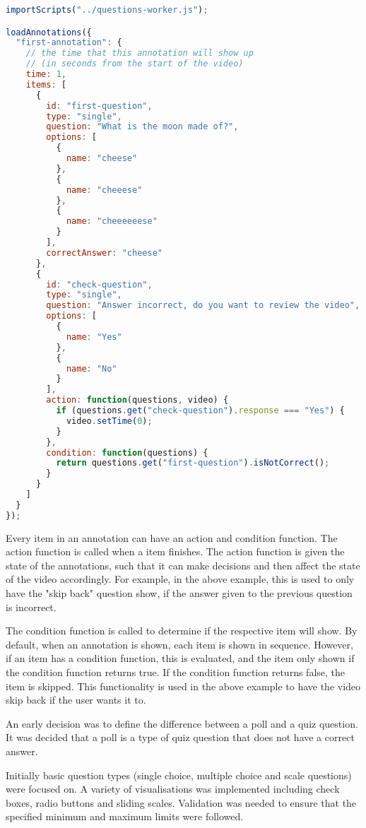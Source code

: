 \begin{lstlisting}[language=javascript,caption={\label{code:questionworker} Code for loading an annotation}]
importScripts("../questions-worker.js");

loadAnnotations({
  "first-annotation": {
    // the time that this annotation will show up
    // (in seconds from the start of the video)
    time: 1,
    items: [
      {
        id: "first-question",
        type: "single",
        question: "What is the moon made of?",
        options: [
          {
            name: "cheese"
          },
          {
            name: "cheeese"
          },
          {
            name: "cheeeeeese"
          }
        ],
        correctAnswer: "cheese"
      },
      {
        id: "check-question",
        type: "single",
        question: "Answer incorrect, do you want to review the video",
        options: [
          {
            name: "Yes"
          },
          {
            name: "No"
          }
        ],
        action: function(questions, video) {
          if (questions.get("check-question").response === "Yes") {
            video.setTime(0);
          }
        },
        condition: function(questions) {
          return questions.get("first-question").isNotCorrect();
        }
      }
    ]
  }
});
\end{lstlisting}

Every item in an annotation can have an action and condition function. The
action function is called when a item finishes. The action function is given
the state of the annotations, such that it can make decisions and then affect
the state of the video accordingly. For example, in the above example, this is
used to only have the "skip back" question show, if the answer given to the
previous question is incorrect.

The condition function is called to determine if the respective item will show.
By default, when an annotation is shown, each item is shown in sequence.
However, if an item has a condition function, this is evaluated, and the item
only shown if the condition function returns true. If the condition function
returns false, the item is skipped. This functionality is used in the above
example to have the video skip back if the user wants it to.


An early decision was to define the difference between a poll and a quiz
question. It was decided that a poll is a type of quiz question that does not
have a correct answer.

Initially basic question types (single choice, multiple choice and scale
questions) were focused on. A variety of visualisations was implemented
including check boxes, radio buttons and sliding scales. Validation was needed
to ensure that the specified minimum and maximum limits were followed.

